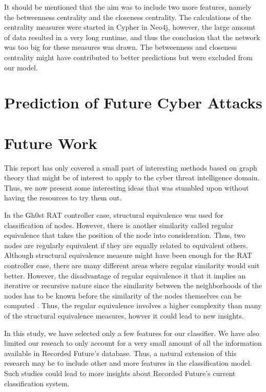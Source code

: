 It should be mentioned that the aim was to include two more features, namely the betweenness centrality and the closeness centrality. The calculations of the centrality measures were started in Cypher in Neo4j, however, the large amount of data resulted in a very long runtime, and thus the conclusion that the network was too big for these measures was drawn. The betweenness and closeness centrality might have contributed to better predictions but were excluded from our model.

\section{Prediction of Future Cyber Attacks}


\section{Future Work}
This report has only covered a small part of interesting methods based on graph theory that might be of interest to apply to the cyber threat intelligence domain. Thus, we now present some interesting ideas that was stumbled upon without having the resources to try them out. 

In the Gh0st RAT controller case, structural equivalence was used for classification of nodes. However, there is another similarity called regular equivalence that takes the position of the node into consideration. Thus, two nodes are regularly equivalent if they are equally related to equivalent others. Although structural equivalence measure might have been enough for the RAT controller case, there are many different areas where regular similarity would suit better. However, the disadvantage of regular equivalence it that it implies an iterative or recursive nature since the similarity between the neighborhoods of the nodes has to be known before the similarity of the nodes themselves can be computed \cite{leicht2006}. Thus, the regular equivalence involves a higher complexity than many of the structural equivalence measures, howver it could lead to new insights. 

In this study, we have selected only a few features for our classifier. We have also limited our reseach to only account for a very small amount of all the information available in Recorded Future's database. Thus, a natural extension of this research may be to include other and more features in the classification model. Such studies could lead to more insights about Recorded Future's current classification system.

